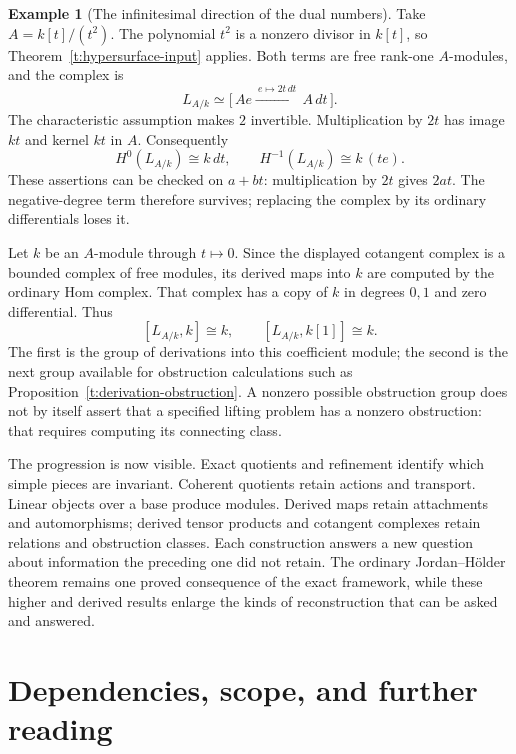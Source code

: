 \documentclass[11pt]{article}
\theoremstyle{definition}
\newtheorem{example}[theorem]{Example}
\theoremstyle{remark}\newtheorem{remark}[theorem]{Remark}
\begin{document}
\begin{example}[The infinitesimal direction of the dual numbers]
\label{t:cotangent-dual-numbers}
Take $A=k[t]/(t^2)$.  The polynomial $t^2$ is a nonzero divisor in
$k[t]$, so Theorem~\ref{t:hypersurface-input} applies.  Both terms are
free rank-one $A$-modules, and the complex is
\[
 L_{A/k}\simeq
 \bigl[\,A e\xrightarrow{\ e\mapsto 2t\,dt\ }A\,dt\,\bigr].
\]
The characteristic assumption makes $2$ invertible.  Multiplication by
$2t$ has image $kt$ and kernel $kt$ in $A$.  Consequently
\[
 H^0(L_{A/k})\cong k\,dt,
 \qquad H^{-1}(L_{A/k})\cong k\,(te).
\]
These assertions can be checked on $a+bt$: multiplication by $2t$
gives $2at$.  The negative-degree term therefore survives; replacing
the complex by its ordinary differentials loses it.

Let $k$ be an $A$-module through $t\mapsto0$.  Since the displayed
cotangent complex is a bounded complex of free modules, its derived
maps into $k$ are computed by the ordinary Hom complex.  That complex
has a copy of $k$ in degrees $0,1$ and zero differential.  Thus
\[
 [L_{A/k},k]\cong k,
 \qquad [L_{A/k},k[1]]\cong k.
\]
The first is the group of derivations into this coefficient module;
the second is the next group available for obstruction calculations
such as Proposition~\ref{t:derivation-obstruction}.  A nonzero possible
obstruction group does not by itself assert that a specified lifting
problem has a nonzero obstruction: that requires computing its
connecting class.
\end{example}

The progression is now visible.  Exact quotients and refinement identify
which simple pieces are invariant.  Coherent quotients retain actions and
transport.  Linear objects over a base produce modules.  Derived maps
retain attachments and automorphisms; derived tensor products and
cotangent complexes retain relations and obstruction classes.  Each
construction answers a new question about information the preceding
one did not retain.  The ordinary Jordan--H\"older theorem remains one
proved consequence of the exact framework, while these higher and
derived results enlarge the kinds of reconstruction that can be asked
and answered.


\clearpage\appendix
\section{Dependencies, scope, and further reading}
\label{a:dependencies}
\end{document}
